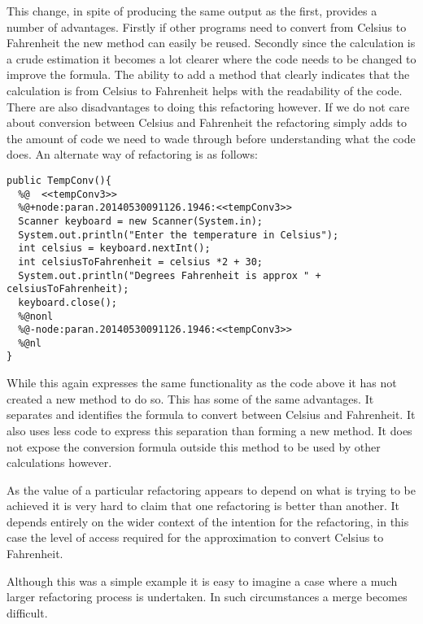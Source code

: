 This change, in spite of producing the same output as the first, provides a number of advantages. Firstly if other programs need to convert from Celsius to Fahrenheit the new method can easily be reused. Secondly since the calculation is a crude estimation it becomes a lot clearer where the code needs to be changed to improve the formula. The ability to add a method that clearly indicates that the calculation is from Celsius to Fahrenheit helps with the readability of the code. There are also disadvantages to doing this refactoring however. If we do not care about conversion between Celsius and Fahrenheit the refactoring simply adds to the amount of code we need to wade through before understanding what the code does. An alternate way of refactoring is as follows:

\begin{verbatim}
public TempConv(){
  %@  <<tempConv3>>
  %@+node:paran.20140530091126.1946:<<tempConv3>>
  Scanner keyboard = new Scanner(System.in);
  System.out.println("Enter the temperature in Celsius");
  int celsius = keyboard.nextInt();
  int celsiusToFahrenheit = celsius *2 + 30;
  System.out.println("Degrees Fahrenheit is approx " + celsiusToFahrenheit);
  keyboard.close();
  %@nonl
  %@-node:paran.20140530091126.1946:<<tempConv3>>
  %@nl
}
\end{verbatim}

While this again expresses the same functionality as the code above it has not created a new method to do so. This has some of the same advantages. It separates and identifies the formula to convert between Celsius and Fahrenheit. It also uses less code to express this separation than forming a new method. It does not expose the conversion formula outside this method to be used by other calculations however.

As the value of a particular refactoring appears to depend on what is trying to be achieved it is very hard to claim that one refactoring is better than another. It depends entirely on the wider context of the intention for the refactoring, in this case the level of access required for the approximation to convert Celsius to Fahrenheit.

Although this was a simple example it is easy to imagine a case where a much larger refactoring process is undertaken. In such circumstances a merge becomes difficult. 


